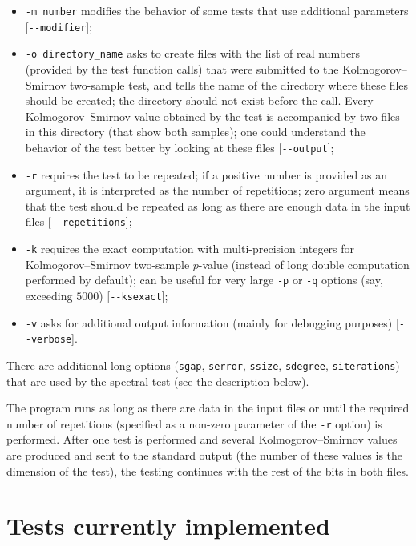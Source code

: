 \documentclass[12pt,a4paper,fullpage]{article}
\begin{document}
\begin{itemize}
\item  \texttt{-m number} modifies the behavior of some tests that use additional parameters [\texttt{{-}-modifier}];

\item \texttt{-o directory\_name} asks to create files with the list of real numbers (provided by the test function calls) that were submitted to the Kolmogorov--Smirnov two-sample test, and tells the name of the directory where these files should be created; the directory should not exist before the call. Every Kolmogorov--Smirnov value obtained by the test is accompanied by two files in this directory (that show both samples); one could understand the behavior of the test better by looking at these files [\texttt{{-}-output}];

\item \texttt{-r} requires the test to be repeated; if a positive number is provided as an argument, it is interpreted as the number of repetitions; zero argument means that the test should be repeated as long as there are enough data in the input files [\texttt{{-}-repetitions}];

\item \texttt{-k} requires the exact computation with multi-precision integers for Kol\-mo\-go\-rov--Smir\-nov two-sample $p$-value (instead of long double computation performed by default); can be useful for very large \texttt{-p} or \texttt{-q} options (say, exceeding $5000$) [\texttt{{-}-ksexact}];

\item \texttt{-v} asks for additional output information (mainly for debugging purposes) [\texttt{{-}-verbose}].
\end{itemize}

There are additional long options (\texttt{sgap}, \texttt{serror}, \texttt{ssize}, \texttt{sdegree}, \texttt{siterations}) that are used by the spectral test (see the description below).

The program runs as long as there are data in the input files or until the required number of repetitions (specified as a non-zero parameter of the \texttt{-r} option) is performed. After one test is performed and several Kolmogorov--Smirnov values are produced and sent to the standard output (the number of these values is the dimension of the test), the testing continues with the rest of the bits in both files.

\section{Tests currently implemented}
\end{document}
